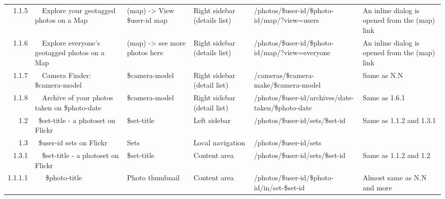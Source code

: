 \documentclass[12pt,a4paper]{article}
\begin{document}
\begin{landscape}
\begin{table}[h!b!p!]
\begin{center}
\begin{tiny}
\begin{tabular}{r|l|l|l|l|p{3cm}}
                1.1.5 &
                ~~Explore your geotagged photos on a Map &
                (map) -> View \$user-id map &
                Right sidebar (details list) &
                /photos/\$user-id/\$photo-id/map/?view=users &
                An inline dialog is opened from the (map) link \\

                1.1.6 &
                ~~Explore everyone's geotagged photos on a Map &
                (map) -> see more photos here &
                Right sidebar (details list) &
                /photos/\$user-id/\$photo-id/map/?view=everyone &
                An inline dialog is opened from the (map) link \\

                1.1.7 &
                ~~Camera Finder: \$camera-model &
                \$camera-model &
                Right sidebar (detail list) &
                /cameras/\$camera-make/\$camera-model &
                Same as N.N \\

                1.1.8 &
                ~~Archive of your photos taken on \$photo-date &
                \$camera-model &
                Right sidebar (detail list) &
                /photos/\$user-id/archives/date-taken/\$photo-date &
                Same as 1.6.1 \\

              1.2 &
              ~\$set-title - a photoset on Flickr &
              \$set-title &
              Left sidebar &
              /photos/\$user-id/sets/\$set-id &
              Same as 1.1.2 and 1.3.1 \\

              1.3 &
              ~\$user-id sets on Flickr &
              Sets &
              Local navigation &
              /photos/\$user-id/sets &
              \\

                1.3.1 &
                ~~\$set-title - a photoset on Flickr &
                \$set-title &
                Content area &
                /photos/\$user-id/sets/\$set-id &
                Same as 1.1.2 and 1.2 \\

                  1.1.1.1 &
                  ~~~\$photo-title &
                  Photo thumbnail &
                  Content area &
                  /photos/\$user-id/\$photo-id/in/set-\$set-id &
                  Almost same as N.N and more\\



\end{tabular}
\end{tiny}
\end{center}
\end{table}
\end{landscape}
\end{document}
